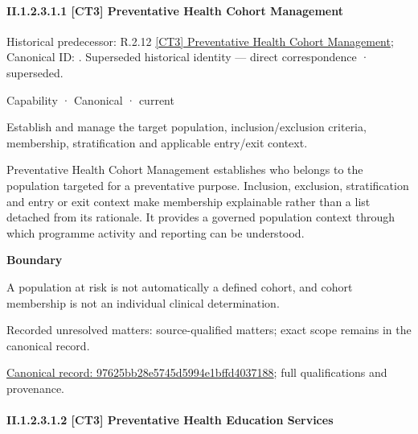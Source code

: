 \paragraph*{II.1.2.3.1.1 [CT3] Preventative Health Cohort Management}
\label{navigation:II.1.2.3.1.1}

{\small Historical predecessor: R.2.12 \hyperref[element:fef479f0fd5048b19b2aec770f0233fe]{[CT3] Preventative Health Cohort Management}; Canonical ID: \texttt{}. Superseded historical identity — direct correspondence · superseded.}\par
\label{element:97625bb28e5745d5994e1bffd4037188}
{\small Capability · Canonical · current}\par

Establish and manage the target population, inclusion/exclusion criteria, membership, stratification and applicable entry/exit context.



Preventative Health Cohort Management establishes who belongs to the population targeted for a preventative purpose. Inclusion, exclusion, stratification and entry or exit context make membership explainable rather than a list detached from its rationale. It provides a governed population context through which programme activity and reporting can be understood.



\textbf{Boundary}



A population at risk is not automatically a defined cohort, and cohort membership is not an individual clinical determination.


{\small Recorded unresolved matters: source-qualified matters; exact scope remains in the canonical record.}\par
{\footnotesize \href{../../../../../../../continuum/strategy/capability/97625bb28e5745d5994e1bffd4037188.md}{Canonical record: 97625bb28e5745d5994e1bffd4037188}; full qualifications and provenance.}\par
\paragraph*{II.1.2.3.1.2 [CT3] Preventative Health Education Services}
\label{navigation:II.1.2.3.1.2}


